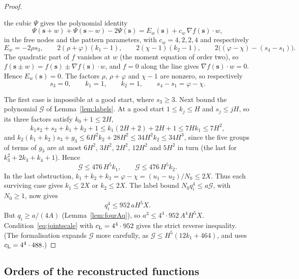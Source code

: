 \documentclass[11pt]{article}
\theoremstyle{definition}
\theoremstyle{remark}
\begin{document}
\begin{proof}
\begin{enumerate}
the cubic $\Psi$ gives the polynomial identity
\[
 \Psi(\mathbf s+w)+\Psi(\mathbf s-w)-2\Psi(\mathbf s)=E_w(\mathbf s)+c_w\,\nabla f(\mathbf s)\cdot w,
\]
in the free nodes and the pattern parameters, with $c_w=4,2,2,4$ and respectively
\[
 E_w=-2\rho s_3,\qquad 2(\rho+\varphi)(k_1-1),\qquad 2(\chi-1)(k_2-1),\qquad
 2\bigl((\varphi-\chi)-(s_4-s_1)\bigr).
\]
The quadratic part of $f$ vanishes at $w$ (the moment equation of order two), so
$f(\mathbf s\pm w)=f(\mathbf s)\pm\nabla f(\mathbf s)\cdot w$, and $f=0$ along the line gives
$\nabla f(\mathbf s)\cdot w=0$. Hence $E_w(\mathbf s)=0$.
The factors $\rho$, $\rho+\varphi$ and $\chi-1$ are nonzero, so respectively
\[
 s_3=0,\qquad k_1=1,\qquad k_2=1,\qquad s_4-s_1=\varphi-\chi.
\]
\end{enumerate}
The first case is impossible at a good start, where $s_3\ge3$. Next bound the polynomial
$\mathcal G$ of Lemma~\ref{lem:labels}. At a good start $1\le k_j\le H$ and $s_j\le jH$, so its
three factors satisfy $k_0+1\le2H$,
\[
 k_1s_2+s_2+k_1+k_2+1\le k_1(2H+2)+2H+1\le7Hk_1\le7H^2,
\]
and $k_2(k_1+k_2)s_3+g_3\le6H^2k_2+28H^2\le34H^2k_2\le34H^3$, since the five groups of terms
of $g_3$ are at most $6H^2$, $3H^2$, $2H^2$, $12H^2$ and $5H^2$ in turn (the last for
$k_3^2+2k_3+k_4+1$). Hence
\[
 \mathcal G\le476\,H^5k_1,\qquad \mathcal G\le476\,H^5k_2.
\]
In the last obstruction, $k_1+k_2+k_3=\varphi-\chi=(u_1-u_2)/N_0\le2X$.
Thus each surviving case gives $k_1\le2X$ or $k_2\le2X$.
The label bound $N_0q_i^4\le a\mathcal G$, with $N_0\ge1$, now gives
\[
 q_i^4\le952\,aH^5X.
\]
But $q_i\ge a/(4A)$ (Lemma~\ref{lem:fourAq}), so $a^3\le4^4\cdot952\,A^4H^5X$.
Condition~\eqref{eq:jointscale} with $c_{\rm L}=4^4\cdot952$ gives the strict reverse
inequality. (The formalisation expands $\mathcal G$ more carefully, as
$\mathcal G\le H^5(12k_1+464)$, and uses $c_{\rm L}=4^4\cdot488$.)
\end{proof}

\subsection{Orders of the reconstructed functions}\label{sec:jointorders}
\end{document}
